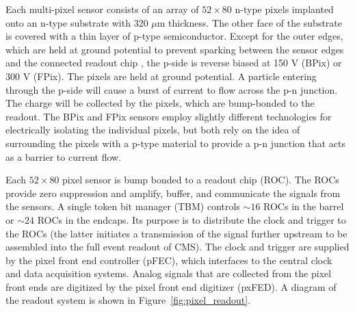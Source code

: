 \documentclass[dissertation.tex]{subfiles}
\begin{document}
Each multi-pixel sensor consists of an array of $52\times80$ n-type pixels implanted onto an n-type substrate with 320 $\mu\mbox{m}$ thickness.  The other face of the substrate is covered with a thin layer of p-type semiconductor.  Except for the outer edges, which are held at ground potential to prevent sparking between the sensor edges and the connected readout chip \cite{Bolla2001182}, the p-side is reverse biased at 150 V (BPix) or 300 V (FPix).  The pixels are held at ground potential.  A particle entering through the p-side will cause a burst of current to flow across the p-n junction.  The charge will be collected by the pixels, which are bump-bonded to the readout.  The BPix and FPix sensors employ slightly different technologies for electrically isolating the individual pixels, but both rely on the idea of surrounding the pixels with a p-type material to provide a p-n junction that acts as a barrier to current flow.

Each $52\times80$ pixel sensor is bump bonded to a readout chip (ROC).  The ROCs provide zero suppression and amplify,  buffer, and communicate the signals from the sensors.  A single token bit manager (TBM) controls $\sim16$ ROCs in the barrel or $\sim24$ ROCs in the endcaps.  Its purpose is to distribute the clock and trigger to the ROCs (the latter initiates a transmission of the signal further upstream to be assembled into the full event readout of CMS).  The clock and trigger are supplied by the pixel front end controller (pFEC), which interfaces to the central clock and data acquisition systems.  Analog signals that are collected from the pixel front ends are digitized by the pixel front end digitizer (pxFED).  A diagram of the readout system is shown in Figure~\ref{fig:pixel_readout}.
\end{document}
